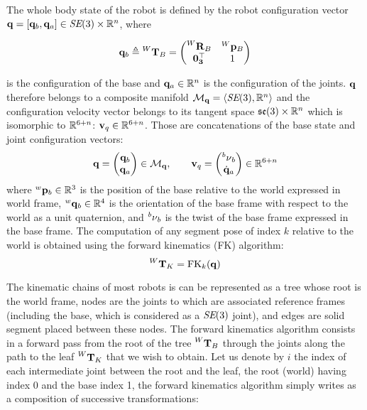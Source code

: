 The whole body state of the robot is defined by the robot configuration vector ${\bf q}=[{\bf q}_b,{\bf q}_a]\in \textit{SE}(3) \times \mathbb{R}^n$, where 

\begin{equation}
    {\bf q}_b \triangleq \prescript{W}{}{{\bf T}}_{B} =  
    \begin{pmatrix}
        \prescript{W}{}{{\bf R}}_{B} & \prescript{W}{}{{\bf p}}_{B} \\
        \bf0_3^{\top} & 1
    \end{pmatrix}
\end{equation}

is the configuration of the base and ${\bf q}_a \in \mathbb{R}^n$ is the configuration of the joints. ${\bf q}$ therefore belongs to a composite manifold $\mathcal{M}_{{\bf q}} = \left<\textit{SE}(3), \mathbb{R}^n \right>$ and the configuration velocity vector belongs to its tangent space ${\mathfrak {se}}(3)\times \mathbb{R}^n$ which is isomorphic to $\mathbb{R}^{6+n}$: ${\bf v}_q \in \mathbb{R}^{6+n}$. Those are concatenations
of the base state and joint configuration vectors:
%
\begin{equation}
    {\bf q}=
    \begin{pmatrix}
        {\bf q}_b \\
        {\bf q}_a
    \end{pmatrix} \in \mathcal{M}_{{\bf q}},
    \quad \quad
    {\bf v}_q=
    \begin{pmatrix}
        \prescript{b}{}{\mathbf{\nu}}_b  \\
        \dot{{\bf q}}_a
    \end{pmatrix}
    \label{eq:configuration} \in \mathbb{R}^{6+n}
\end{equation}
%
where $\prescript{w}{}{{\bf p}}_{b} \in \mathbb{R}^3$ is the position of the base relative to the world expressed in world frame, $\prescript{w}{}{{\bf q}}_b \in \mathbb{R}^4$ is the orientation 
of the base frame with respect to the world as a unit quaternion, and $\prescript{b}{}{\mathbf{\nu}}_b$ is the twist of the base frame expressed in the base frame.
The computation of any segment pose of index $k$ relative to the world is obtained using the forward kinematics (FK) algorithm:
%
\begin{equation}
    \prescript{W}{}{{\bf T}}_{K} = \text{FK}_k({\bf q})
\end{equation}

The kinematic chains of most robots is can be represented as a tree whose root is the world frame, nodes are the joints to which are associated reference frames (including the base, which is considered as a $\textit{SE}(3)$ joint), and edges are solid segment placed between these nodes.
The forward kinematics algorithm consists in a forward pass from the root of the tree $\prescript{W}{}{{\bf T}}_{B}$ through the joints along the path to the leaf $\prescript{W}{}{{\bf T}}_{K}$ that we wish to obtain. Let us denote by $i$ the index of each intermediate joint between the root and the leaf, the root (world) having index 0 and the base index 1, the forward kinematics algorithm simply writes as a composition of successive transformations:

